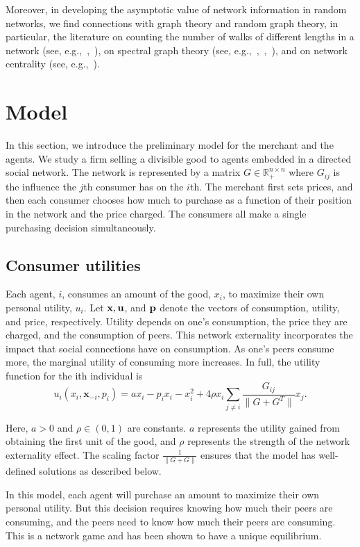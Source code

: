 	Moreover, in developing the asymptotic value
	of network information in random networks, we find connections
	with graph theory and random graph theory, in particular, the literature on counting
	the number of walks of different lengths in a network
	(see, e.g.,~\cite{fiol2009number},~\cite{levin2017counting}), on spectral
	graph theory (see, e.g.,~\cite{krivelevich2003largest},~\cite{chung2004spectra},~\cite{preciado2017moment}), and on
	network centrality (see, e.g.,~\cite{bonacich1987power}).


\section{Model}\label{sec:pricing:model}
In this section, we introduce the preliminary model for the merchant and the agents. We study a firm selling a divisible good to agents embedded in a directed social network. The network is represented by a matrix $G \in \mathbb{R}^{n\times n}_{+}$ where $G_{ij}$ is the influence the $j$th consumer has on the $i$th.   The merchant first sets prices, and then each consumer chooses how much to purchase as a function of their position in the network and the price charged. The consumers all make a single purchasing decision simultaneously. 

  
\subsection{Consumer utilities}
Each agent, $i$, consumes an amount of the good, $x_i$, to maximize their own personal utility, $u_i$. Let $\mathbf{x},\mathbf{u}$, and $\mathbf{p}$ denote the vectors of consumption, utility, and price, respectively. Utility depends on one's consumption, the price they are charged, and the consumption of peers. This network externality incorporates the impact that social connections have on consumption. As one's peers consume more, the marginal   utility of consuming more increases.  In full, the utility function for the ith individual is 
\[u_i(x_i, \mathbf{x}_{-i}, p_i) = ax_i - p_i x_i - x_i^2 + 4\rho x_i \sum_{j\neq i} \frac{G_{ij}}{\| G +G^T\|}x_j .\]

Here, $a>0$ and $\rho \in (0,1)$ are constants. $a$ represents the utility gained from obtaining the first unit of the good, and $\rho$ represents the strength of the network externality effect.  The scaling factor $\frac{1}{\|G+G\|}$ ensures that the model has well-defined solutions as described below. 

In this model, each agent will purchase an amount to maximize their own personal utility. But this decision requires knowing how much their peers are consuming, and the peers need to know how much their peers are consuming.  This is a network game and has been shown to have a unique equilibrium. 

